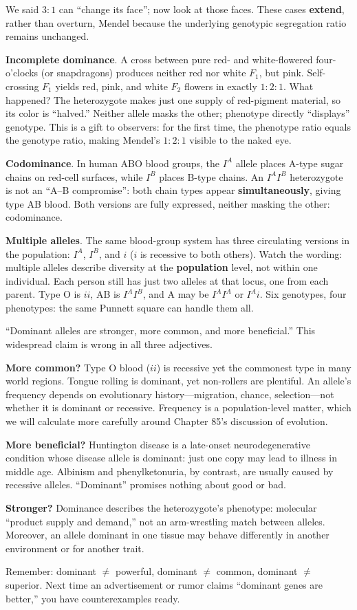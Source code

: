 We said $3:1$ can ``change its face''; now look at those faces. These cases \textbf{extend}, rather than overturn, Mendel because the underlying genotypic segregation ratio remains unchanged.

\textbf{Incomplete dominance}. A cross between pure red- and white-flowered four-o'clocks (or snapdragons) produces neither red nor white $F_1$, but pink. Self-crossing $F_1$ yields red, pink, and white $F_2$ flowers in exactly $1:2:1$. What happened? The heterozygote makes just one supply of red-pigment material, so its color is ``halved.'' Neither allele masks the other; phenotype directly ``displays'' genotype. This is a gift to observers: for the first time, the phenotype ratio equals the genotype ratio, making Mendel's $1:2:1$ visible to the naked eye.

\textbf{Codominance}. In human ABO blood groups, the $I^A$ allele places A-type sugar chains on red-cell surfaces, while $I^B$ places B-type chains. An $I^A I^B$ heterozygote is not an ``A--B compromise'': both chain types appear \textbf{simultaneously}, giving type AB blood. Both versions are fully expressed, neither masking the other: codominance.

\textbf{Multiple alleles}. The same blood-group system has three circulating versions in the population: $I^A$, $I^B$, and $i$ ($i$ is recessive to both others). Watch the wording: multiple alleles describe diversity at the \textbf{population} level, not within one individual. Each person still has just two alleles at that locus, one from each parent. Type O is $ii$, AB is $I^A I^B$, and A may be $I^A I^A$ or $I^A i$. Six genotypes, four phenotypes: the same Punnett square can handle them all.

\begin{wuqu}
``Dominant alleles are stronger, more common, and more beneficial.'' This widespread claim is wrong in all three adjectives.

\textbf{More common?} Type O blood ($ii$) is recessive yet the commonest type in many world regions. Tongue rolling is dominant, yet non-rollers are plentiful. An allele's frequency depends on evolutionary history---migration, chance, selection---not whether it is dominant or recessive. Frequency is a population-level matter, which we will calculate more carefully around Chapter 85's discussion of evolution.

\textbf{More beneficial?} Huntington disease is a late-onset neurodegenerative condition whose disease allele is dominant: just one copy may lead to illness in middle age. Albinism and phenylketonuria, by contrast, are usually caused by recessive alleles. ``Dominant'' promises nothing about good or bad.

\textbf{Stronger?} Dominance describes the heterozygote's phenotype: molecular ``product supply and demand,'' not an arm-wrestling match between alleles. Moreover, an allele dominant in one tissue may behave differently in another environment or for another trait.

Remember: dominant $\neq$ powerful, dominant $\neq$ common, dominant $\neq$ superior. Next time an advertisement or rumor claims ``dominant genes are better,'' you have counterexamples ready.
\end{wuqu}

